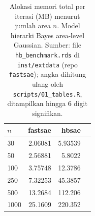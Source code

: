 \begin{table}[htbp]
\centering
\caption{Alokasi memori total per iterasi (MB) menurut jumlah area $n$. Model hierarki Bayes area-level Gaussian. Sumber: file \texttt{hb\_benchmark.rds} di \texttt{inst/extdata} (repo \texttt{fastsae}); angka dihitung ulang oleh \texttt{scripts/01\_tables.R}, ditampilkan hingga 6 digit signifikan.}
\label{tab:mem-hb}
\small
\begin{tabular}{lrrr}
\toprule
$n$ & fastsae & hbsae \\
\midrule
30 & 2.06081 & 5.93539 \\
50 & 2.56881 &  5.8022 \\
100 & 3.75748 & 12.3786 \\
250 & 7.32253 & 45.3857 \\
500 & 13.2684 & 112.206 \\
1000 & 25.1609 & 220.352 \\
\bottomrule
\end{tabular}
\end{table}

